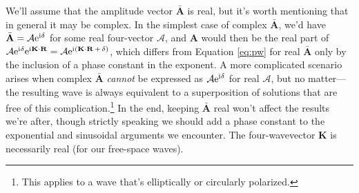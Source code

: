 \documentclass[12pt]{article}
\renewcommand{\vv}[1]{\mathbf{#1}}
\begin{document}
We'll assume that the amplitude vector $\bar{\vv A}$ is real, but it's worth mentioning that in general it may be complex. In the simplest case of complex $\bar{\vv A}$, we'd have $\bar{\vv A} = \mathcal{A} \mathrm{e}^{\mathrm{i} \mkern.5mu \delta}$ for some real four-vector $\mathcal{A}$, and $\vv A$ would then be the real part of ${\mathcal{A} \mathrm{e}^{\mathrm{i} \mkern.5mu \delta} \mathrm{e}^{\mathrm{i} \mkern.5mu \vv K \cdot \vv R} = \mathcal{A} \mathrm{e}^{\mathrm{i} \mkern.5mu ( \vv K \cdot \vv R \, + \, \delta )}}$, which differs from Equation \ref{eq:pw} for real $\bar{\vv A}$ only by the inclusion of a phase constant in the exponent. A more complicated scenario arises when complex $\bar{\vv A}$ \emph{cannot} be expressed as $\mathcal{A} \mathrm{e}^{\mathrm{i} \mkern.5mu \delta}$ for real $\mathcal{A}$, but no matter---the resulting wave is always equivalent to a superposition of solutions that are free of this complication.\footnote{\label{fn:pol}This applies to a wave that's elliptically or circularly polarized.} In the end, keeping $\bar{\vv A}$ real won't affect the results we're after, though strictly speaking we should add a phase constant to the exponential and sinusoidal arguments we encounter. The four-wavevector $\vv K$ is necessarily real (for our free-space waves).
\end{document}
